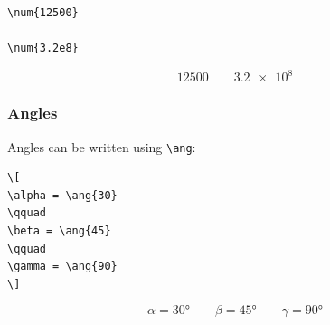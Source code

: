 \begin{lstlisting}[style=latex]
\num{12500}

\num{3.2e8}
\end{lstlisting}

\[
\num{12500}
\qquad
\num{3.2e8}
\]


\subsubsection{Angles}

Angles can be written using \verb|\ang|:

\begin{lstlisting}[style=latex]
\[
\alpha = \ang{30}
\qquad
\beta = \ang{45}
\qquad
\gamma = \ang{90}
\]
\end{lstlisting}

\[
\alpha = \ang{30}
\qquad
\beta = \ang{45}
\qquad
\gamma = \ang{90}
\]